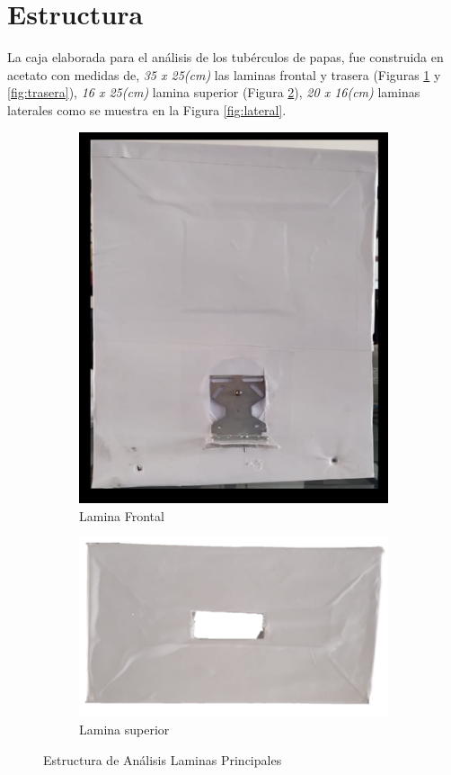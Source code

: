 \newpage	
\section{Estructura}
La caja elaborada para el análisis de los tubérculos de papas, fue construida en acetato con medidas de, \textit{35 x 25(cm)} las laminas frontal y trasera (Figuras \ref{fig:frontal} y \ref{fig:trasera}), \textit{16 x 25(cm)} lamina superior (Figura \ref{fig:superior}), \textit{20 x 16(cm)} laminas laterales como se muestra en la Figura \ref{fig:lateral}.

\begin{figure}[h!]
	\centering
	\begin{subfigure}{0.45\linewidth}
		\centering
		\includegraphics[scale=0.3]{Figs/300.png}
		\caption{Lamina Frontal}
		\label{fig:frontal}
	\end{subfigure}
	\begin{subfigure}{0.45\linewidth}
		\centering
		\includegraphics[scale=0.5]{Figs/301.png}
		\caption{Lamina superior}
		\label{fig:superior}
	\end{subfigure}
	\caption{Estructura de Análisis Laminas Principales}
	\label{fig:estructura}
\end{figure} 

